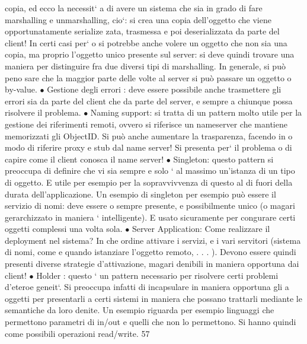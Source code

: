 \documentclass[a4paper,12pt]{article}
\begin{document}
copia, ed ecco la necessit`
a
di avere un sistema che sia in grado di fare marshalling e unmarshalling,
cio`: si crea una copia dell'oggetto che viene opportunatamente serialize
zata, trasmessa e poi deserializzata da parte del client! In certi casi per`
o
si potrebbe anche volere un oggetto che non sia una copia, ma proprio
l'oggetto unico presente sul server: si deve quindi trovare una maniera per
distinguire fra due diversi tipi di marshalling. In generale, si può peno
sare che la maggior parte delle volte al server si può passare un oggetto
o
by-value.
$\bullet$ Gestione degli errori : deve essere possibile anche trasmettere gli errori
sia da parte del client che da parte del server, e sempre a chiunque possa
risolvere il problema.
$\bullet$ Naming support: si tratta di un pattern molto utile per la gestione dei
riferimenti remoti, ovvero si riferisce un nameserver che mantiene memorizzati gli ObjectID. Si può anche aumentare la
trasparenza, facendo in
o
modo di riferire proxy e stub dal name server! Si presenta per` il problema
o
di capire come il client conosca il name server!
$\bullet$ Singleton: questo pattern si preoccupa di definire che vi sia sempre e solo
`
al massimo un'istanza di un tipo di oggetto. E utile per esempio per
la sopravvivvenza di questo al di fuori della durata dell'applicazione. Un
esempio di singleton per esempio può essere il servizio di nomi: deve essere
o
sempre presente, e possibilmente unico (o magari gerarchizzato in maniera
`
intelligente). E usato sicuramente per congurare certi oggetti complessi
una volta sola.
$\bullet$ Server Application: Come realizzare il deployment nel sistema? In che
ordine attivare i servizi, e i vari servitori (sistema di nomi, come e quando
istanziare l'oggetto remoto, . . . ). Devono essere quindi presenti diverse
strategie d'attivazione, magari denibili in maniera opportuna dai client!
$\bullet$ Holder : questo ` un pattern necessario per risolvere certi problemi d'eteroe
geneit`. Si preoccupa infatti di incapsulare in maniera opportuna gli
a
oggetti per presentarli a certi sistemi in maniera che possano trattarli
mediante le semantiche da loro denite. Un esempio riguarda per esempio linguaggi che permettono parametri di in/out e
quelli che non lo
permettono. Si hanno quindi come possibili operazioni read/write.
57
\end{document}
